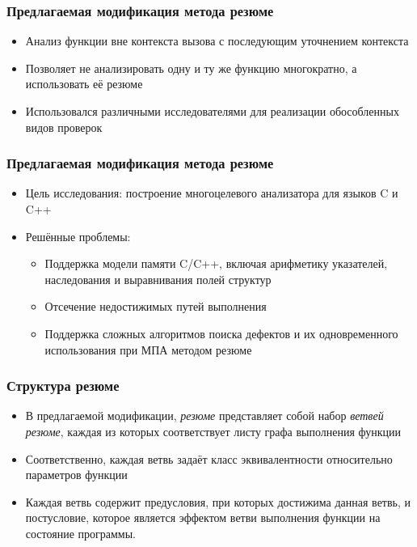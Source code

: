 \documentclass[hyperref={pdfpagelabels=false}]{beamer}
\begin{document}
\begin{frame}[allowframebreaks]
\frametitle{Предлагаемая модификация метода резюме}
\begin{itemize}
  \item Анализ функции вне контекста вызова с последующим уточнением контекста
  \item Позволяет не анализировать одну и ту же функцию многократно, а использовать её резюме
  \item Использовался различными исследователями для реализации обособленных видов проверок
\end{itemize}
\end{frame}

\begin{frame}[allowframebreaks]
\frametitle{Предлагаемая модификация метода резюме}
\begin{itemize}
  \item Цель исследования: построение многоцелевого анализатора для языков C и C++
  \item Решённые проблемы:
  \begin{itemize}
    \item Поддержка модели памяти C/C++, включая арифметику указателей, наследования и выравнивания полей структур
    \item Отсечение недостижимых путей выполнения
    \item Поддержка сложных алгоритмов поиска дефектов и их одновременного использования при МПА методом резюме
  \end{itemize}
\end{itemize}
\end{frame}

\begin{frame}
\frametitle{Структура резюме}
\begin{itemize}
  \item В предлагаемой модификации, \textit{резюме} представляет собой набор \textit{ветвей резюме}, каждая из которых соответствует листу графа выполнения функции
  \item Соответственно, каждая ветвь задаёт класс эквивалентности относительно параметров функции
  \item Каждая ветвь содержит предусловия, при которых достижима данная ветвь, и постусловие, которое является эффектом ветви выполнения функции на состояние программы.
\end{itemize}
\end{frame}
\end{document}
